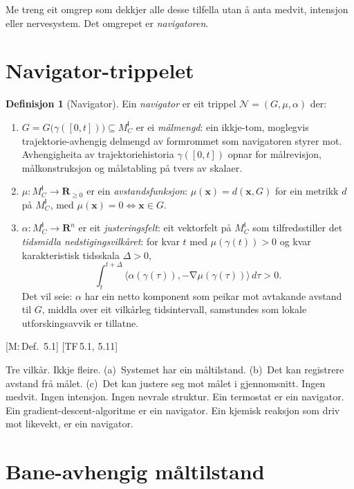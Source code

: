 \documentclass[10pt]{book}
\theoremstyle{definition}
\newtheorem{definisjon}{Definisjon}[chapter]
\theoremstyle{plain}
\theoremstyle{remark}
\newcommand{\MC}{M^{\mathsf{I}}_C}
\providecommand{\Rn}{}
\renewcommand{\Rn}{\mathbf{R}^n}
\providecommand{\R}{}
\renewcommand{\R}{\mathbf{R}}
\newcommand{\Nav}{\mathcal{N}}
\newcommand{\inner}[2]{\langle #1, #2 \rangle}
\DeclareMathOperator{\grad}{\nabla}
\newcommand{\TF}[1]{\textnormal{[TF\,#1]}}
\newcommand{\Mref}[1]{\textnormal{[M:\,#1]}}
\begin{document}
Me treng eit omgrep som dekkjer alle desse tilfella utan \aa{} anta medvit, intensjon eller nervesystem. Det omgrepet er \emph{navigatoren}.

\section{Navigator-trippelet}\label{sec:nav:def}

\begin{definisjon}[Navigator]\label{def:navigator}
Ein \emph{navigator} er eit trippel $\Nav = (G, \mu, \alpha)$ der:
\begin{enumerate}[label=(\alph*)]
  \item $G = G\bigl(\gamma([0,t])\bigr) \subseteq \MC$ er ei \emph{m\aa lmengd}: ein ikkje-tom, moglegvis trajektorie-avhengig delmengd av formrommet som navigatoren styrer mot. Avhengigheita av trajektoriehistoria $\gamma([0,t])$ opnar for m\aa lrevisjon, m\aa lkonstruksjon og m\aa lstabling p\aa{} tvers av skalaer.
  \item $\mu : \MC \to \R_{\geq 0}$ er ein \emph{avstandsfunksjon}: $\mu(\bm{x}) = d(\bm{x}, G)$ for ein metrikk $d$ p\aa{} $\MC$, med $\mu(\bm{x}) = 0 \iff \bm{x} \in G$.
  \item $\alpha : \MC \to \Rn$ er eit \emph{justeringsfelt}: eit vektorfelt p\aa{} $\MC$ som tilfredsstiller det \emph{tidsmidla nedstigingsvilk\aa ret}: for kvar $t$ med $\mu(\gamma(t)) > 0$ og kvar karakteristisk tidsskala $\Delta > 0$,
  \begin{equation}\label{eq:justering}
    \int_t^{t+\Delta} \inner{\alpha(\gamma(\tau))}{-\grad\mu(\gamma(\tau))} \, d\tau > 0.
  \end{equation}
  Det vil seie: $\alpha$ har ein netto komponent som peikar mot avtakande avstand til $G$, middla over eit vilk\aa rleg tidsintervall, samstundes som lokale utforskingsavvik er tillatne.
\end{enumerate}
\Mref{Def.~5.1} \TF{5.1, 5.11}
\end{definisjon}

Tre vilk\aa r. Ikkje fleire. (a)~Systemet har ein m\aa ltilstand. (b)~Det kan registrere avstand fr\aa{} m\aa let. (c)~Det kan justere seg mot m\aa let i gjennomsnitt. Ingen medvit. Ingen intensjon. Ingen nevrale struktur. Ein termostat er ein navigator. Ein gradient-descent-algoritme er ein navigator. Ein kjemisk reaksjon som driv mot likevekt, er ein navigator.

\section{Bane-avhengig m\aa ltilstand}\label{sec:nav:bane}
\end{document}
